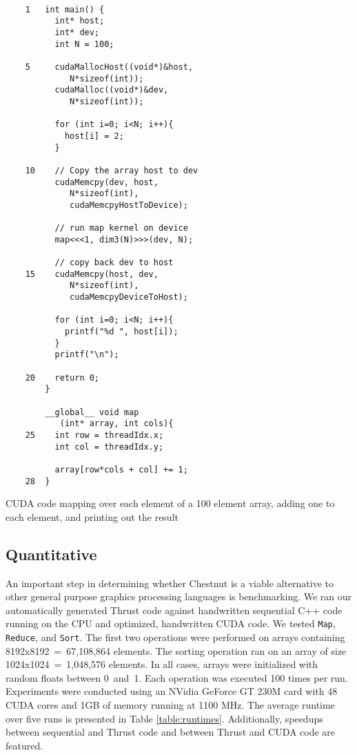 \documentclass[twocolumn]{article}
\renewcommand{\|}{\origbar} %
\newcommand{\code}[1]{\texttt{#1}}
\begin{document}
\begin{Code Snippet}
\begin{verbatim}
 
    1   int main() {
          int* host;
          int* dev;
          int N = 100;
     
    5     cudaMallocHost((void*)&host, 
             N*sizeof(int));
          cudaMalloc((void*)&dev, 
             N*sizeof(int));
      
          for (int i=0; i<N; i++){
            host[i] = 2;
          }
 
    10    // Copy the array host to dev
          cudaMemcpy(dev, host, 
             N*sizeof(int),
             cudaMemcpyHostToDevice);
 
          // run map kernel on device
          map<<<1, dim3(N)>>>(dev, N);
 
          // copy back dev to host
    15    cudaMemcpy(host, dev, 
             N*sizeof(int),
             cudaMemcpyDeviceToHost);
      
          for (int i=0; i<N; i++){
            printf("%d ", host[i]);
          }
          printf("\n");
      
    20    return 0;
        }
 
        __global__ void map
           (int* array, int cols){
    25    int row = threadIdx.x;
          int col = threadIdx.y;
       
          array[row*cols + col] += 1;
    28  }                                    
\end{verbatim}
\caption{CUDA code mapping over each element of a 100 element array, adding one to each element, and printing out the result}
\label{code:cudaExperiment}
\end{Code Snippet}

\subsection{Quantitative}

An important step in determining whether Chestnut is a viable alternative to other general purpose graphics processing languages is benchmarking. We ran our automatically generated Thrust code against handwritten sequential C++ code running on the CPU and optimized, handwritten CUDA code. We tested \code{Map}, \code{Reduce}, and \code{Sort}. The first two operations were performed on arrays containing 8192x8192~=~67,108,864 elements. The sorting operation ran on an array of size 1024x1024~=~1,048,576 elements. In all cases, arrays were initialized with random floats between 0~and~1. Each operation was executed 100 times per run. Experiments were conducted using an NVidia GeForce GT 230M card with 48 CUDA cores and 1GB of memory running at 1100 MHz. The average runtime over five runs is presented in Table \ref{table:runtimes}. Additionally, speedups between sequential and Thrust code and between Thrust and CUDA code are featured.
\end{document}
